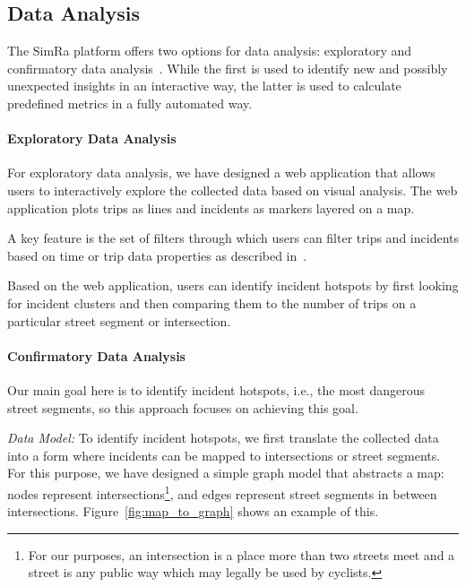 \subsection{Data Analysis}
\label{subsec:data_analysis}
The SimRa platform offers two options for data analysis: exploratory and confirmatory data analysis~\cite{book_bermbach_benchmarking}.
While the first is used to identify new and possibly unexpected insights in an interactive way, the latter is used to calculate predefined metrics in a fully automated way.

\paragraph{Exploratory Data Analysis} \label{subsec:exploratory}
For exploratory data analysis, we have designed a web application that allows users to interactively explore the collected data based on visual analysis.
The web application plots trips as lines and incidents as markers layered on a map.

A key feature is the set of filters through which users can filter trips and incidents based on time or trip data properties as described in~.

Based on the web application, users can identify incident hotspots by first looking for incident clusters and then comparing them to the number of trips on a particular street segment or intersection.


\paragraph{Confirmatory Data Analysis}
Our main goal here is to identify incident hotspots, i.e., the most dangerous street segments, so this approach focuses on achieving this goal.

\textit{Data Model:} To identify incident hotspots, we first translate the collected data into a form where incidents can be mapped to intersections or street segments.
For this purpose, we have designed a simple graph model that abstracts a map: nodes represent intersections\footnote{For our purposes, an intersection is a place more than two streets meet and a street is any public way which may legally be used by cyclists.}, and edges represent street segments in between intersections.
Figure~\ref{fig:map_to_graph} shows an example of this.

